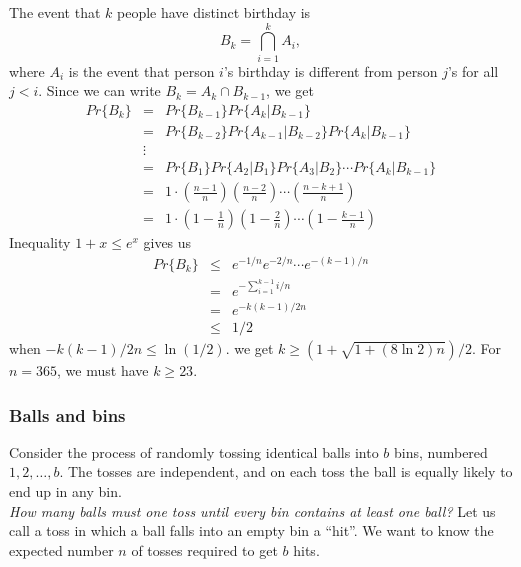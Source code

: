 \documentclass[12pt]{article}
\begin{document}
The event that $k$ people have distinct birthday is
\begin{equation*}
  B_k = \bigcap_{i=1}^k A_i,
\end{equation*}
where $A_i$ is the event that person $i$'s birthday is different from person $j$'s for all $j < i$. Since we can write $B_k = A_k \cap B_{k-1}$, we get
\begin{eqnarray*}
  Pr \{ B_k \} 
  &=& Pr \{ B_{k-1} \} Pr \{ A_k | B_{k-1} \} \\
  &=& Pr \{ B_{k-2} \} Pr \{ A_{k-1} | B_{k-2} \} Pr \{ A_{k} | B_{k-1} \} \\
  &\vdots& \\
  &=& Pr \{ B_{1} \} Pr \{ A_{2} | B_{1} \} Pr \{ A_{3} | B_{2} \} \cdots
      Pr \{ A_{k} | B_{k-1} \} \\
  &=& 1 \cdot \left( \frac {n-1}{n} \right) \left( \frac {n-2}{n} \right)
      \cdots \left( \frac {n-k+1}{n} \right) \\
  &=& 1 \cdot \left( 1 - \frac {1}{n} \right) \left( 1 - \frac {2}{n} \right)
      \cdots \left( 1 - \frac {k-1}{n} \right)
\end{eqnarray*}
Inequality $1 + x \le e^x$ gives us
\begin{eqnarray*}
  Pr \{ B_k \} 
  &\le& e^{-1/n} e^{-2/n} \cdots e^{-(k-1)/n} \\
  &=& e^{- \sum_{i=1}^{k-1} i/n} \\
  &=& e^{-k(k-1)/2n} \\
  &\le& 1/2
\end{eqnarray*}
when $-k(k-1)/2n \le \ln(1/2)$. we get $k \ge (1 + \sqrt {1 + (8 \ln 2)n})/2$. For $n = 365$, we must have $k \ge 23$.

\subsubsection{Balls and bins}

Consider the process of randomly tossing identical balls into $b$ bins, numbered $1, 2, \dots, b$. The tosses are independent, and on each toss the ball is equally likely to end up in any bin. \\

\emph{How many balls must one toss until every bin contains at least one ball?} Let us call a toss in which a ball falls into an empty bin a ``hit''. We want to know the expected number $n$ of tosses required to get $b$ hits. \\
\end{document}
